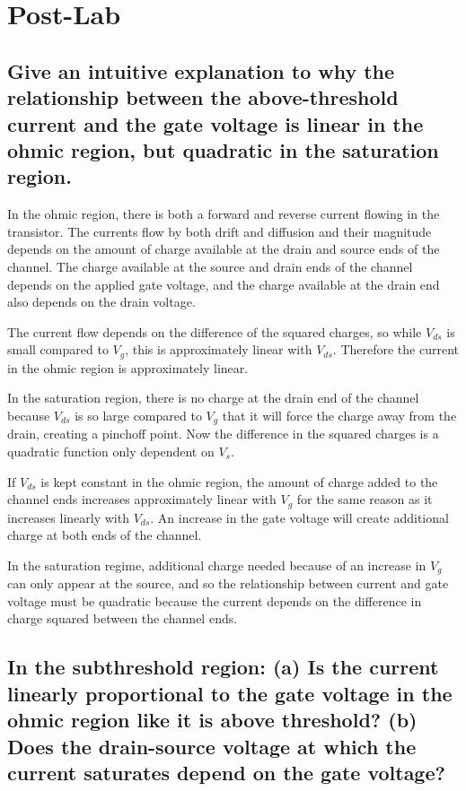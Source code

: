 

\newcommand{\reffig}[1]{Fig.~\ref{#1}}



\newpage
\section{Post-Lab}
\subsection{Give an intuitive explanation to why the relationship between the above-threshold current
and the gate voltage is linear in the ohmic region, but quadratic in the saturation region.}

In the ohmic region, there is both a forward and reverse current flowing in the transistor. The currents
flow by both drift and diffusion and their magnitude depends on the amount of charge available at the drain
and source ends of the channel. The charge available at the source and drain ends of the channel depends
on the applied gate voltage, and the charge available at the drain end also depends on the drain voltage.

The current flow depends on the difference of the squared charges, so while \(V_{ds}\) is small compared to \(V_g\), this is approximately
linear with \(V_{ds}\). Therefore the current in the ohmic region is approximately linear.

In the saturation region, there is no charge at the drain end of the channel because \(V_{ds}\) is so large compared
to \(V_g\) that it will force the charge away from the drain, creating a pinchoff point. Now the difference in
the squared charges is a quadratic function only dependent on \(V_s\).

If \(V_{ds}\) is kept constant in the ohmic region, the amount of charge added to the channel ends increases approximately
linear with \(V_g\) for the same reason as it increases linearly with \(V_{ds}\). An increase in the gate voltage will 
create additional charge at both ends of the channel.

In the saturation regime, additional charge needed because of an increase in \(V_g\) can only appear at the source, and
so the relationship between current and gate voltage must be quadratic because the current depends on the difference
in charge squared between the channel ends.

\subsection{In the subthreshold region: (a) Is the current linearly proportional to the gate voltage in the ohmic region
like it is above threshold? (b) Does the drain-source voltage at which the current saturates depend on the gate voltage?}

